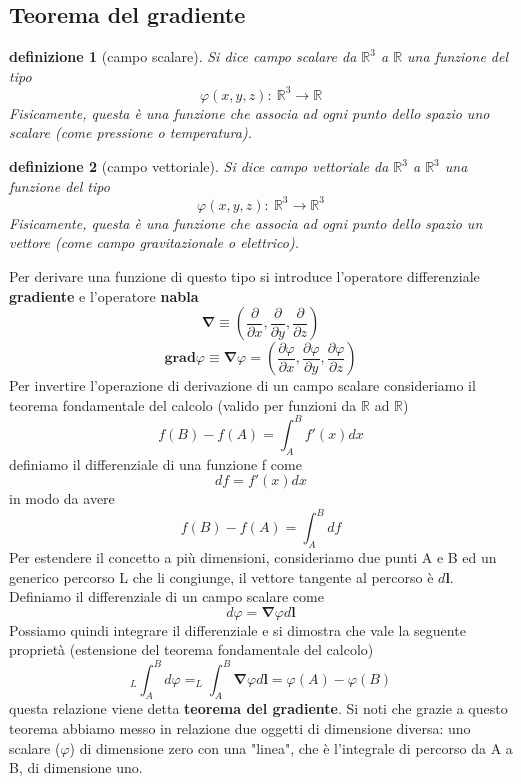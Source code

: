 \documentclass[10pt,a4paper]{article}
\newtheorem{definizione}{definizione}
\begin{document}
\subsection{Teorema del gradiente}
\begin{definizione}[campo scalare]
	Si dice campo scalare da \(\mathbb{R}^3\) a \(\mathbb{R}\) una funzione del tipo 
	\[\varphi(x, y, z):\ \mathbb{R}^3\rightarrow \mathbb{R}\]
	Fisicamente, questa è una funzione che associa ad ogni punto dello spazio uno scalare (come pressione o temperatura).
\end{definizione}
\begin{definizione}[campo vettoriale]
	Si dice campo vettoriale da \(\mathbb{R}^3\) a \(\mathbb{R}^3\) una funzione del tipo 
	\[\varphi(x, y, z):\ \mathbb{R}^3\rightarrow \mathbb{R}^3\]
	Fisicamente, questa è una funzione che associa ad ogni punto dello spazio un vettore (come campo gravitazionale o elettrico).
\end{definizione}
Per derivare una funzione di questo tipo si introduce l'operatore differenziale \textbf{gradiente} e l'operatore \textbf{nabla}
\[\mathbf{\nabla} \equiv \left(\frac{\partial}{\partial x}, \frac{\partial }{\partial y}, \frac{\partial }{\partial z}\right)\]
\[\mathbf{grad}\varphi \equiv \mathbf{\nabla}\varphi = \left(\frac{\partial\varphi }{\partial x}, \frac{\partial\varphi }{\partial y}, \frac{\partial\varphi }{\partial z}\right)\]
Per invertire l'operazione di derivazione di un campo scalare consideriamo il teorema fondamentale del calcolo (valido per funzioni da \(\mathbb{R}\) ad \(\mathbb{R}\))
\[f(B)-f(A) = \int_{A}^{B}f'(x)dx\]
definiamo il differenziale di una funzione f come
\[df = f'(x)dx\] 
in modo da avere
\[f(B)-f(A) = \int_{A}^{B}df\]
Per estendere il concetto a più dimensioni, consideriamo due punti A e B ed un generico percorso L che li congiunge, il vettore tangente al percorso è $d\mathbf{l}$.  Definiamo il differenziale di un campo scalare come 
\[d\varphi = \mathbf{\nabla}\varphi d\mathbf{l}\]
Possiamo quindi integrare il differenziale e si dimostra che vale la seguente proprietà (estensione del teorema fondamentale del calcolo)
\[_L\int_{A}^{B}d\varphi = _L\int_{A}^{B}\mathbf{\nabla}\varphi d\mathbf{l} = \varphi(A)-\varphi(B)\]
questa relazione viene detta \textbf{teorema del gradiente}. Si noti che grazie a questo teorema abbiamo messo in relazione due oggetti di dimensione diversa: uno scalare (\(\varphi\)) di dimensione zero con una "linea", che è l'integrale di percorso da A a B, di dimensione uno.
\end{document}
